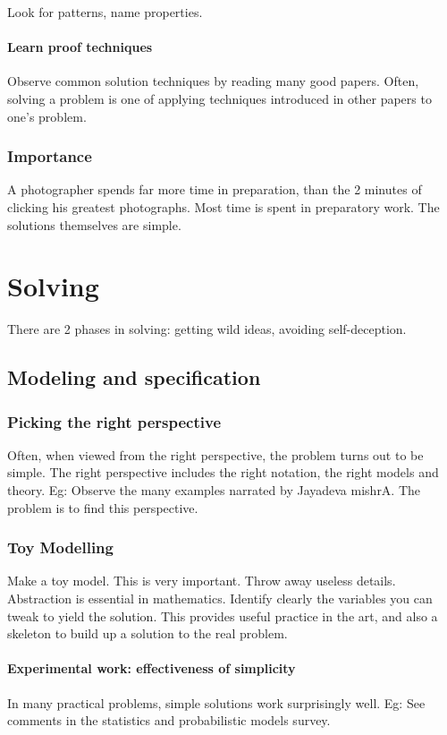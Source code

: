 \documentclass[oneside, article]{memoir}
\begin{document}
Look for patterns, name properties.

\subsubsection{Learn proof techniques}
Observe common solution techniques by reading many good papers. Often, solving a problem is one of applying techniques introduced in other papers to one's problem.

\subsection{Importance}
A photographer spends far more time in preparation, than the 2 minutes of clicking his greatest photographs. Most time is spent in preparatory work. The solutions themselves are simple.

\chapter{Solving}
There are 2 phases in solving: getting wild ideas, avoiding self-deception.

\section{Modeling and specification}
\subsection{Picking the right perspective}
Often, when viewed from the right perspective, the problem turns out to be simple. The right perspective includes the right notation, the right models and theory. Eg: Observe the many examples narrated by Jayadeva mishrA. The problem is to find this perspective.

\subsection{Toy Modelling}
Make a toy model. This is very important. Throw away useless details. Abstraction is essential in mathematics. Identify clearly the variables you can tweak to yield the solution. This provides useful practice in the art, and also a skeleton to build up a solution to the real problem.

\subsubsection{Experimental work: effectiveness of simplicity}
In many practical problems, simple solutions work surprisingly well. Eg: See comments in the statistics and probabilistic models survey.
\end{document}

